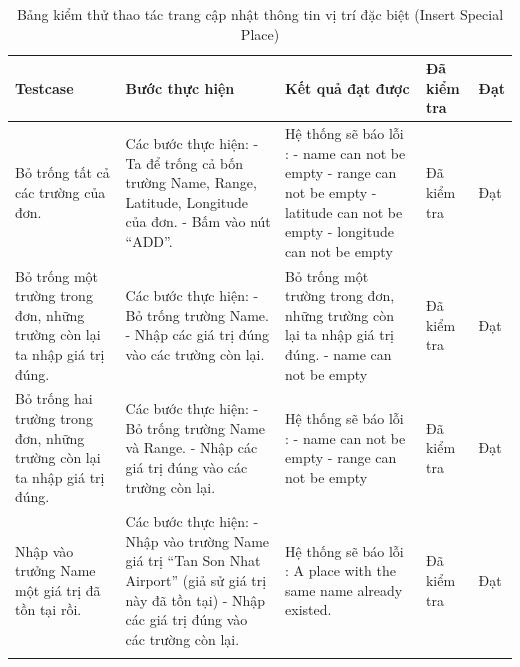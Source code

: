 \documentclass[a4paper]{article}
\begin{document}
\begin{longtable}{ | p{} |p{} | p{}  | p{}  | p{}  | } 
\hline
\textbf{Testcase}& \textbf{Bước thực hiện}& \textbf{Kết quả đạt được} & \textbf{Đã kiểm tra}& \textbf{Đạt} \\ 
\hline
\hline
Bỏ trống tất cả các trường của đơn. &
Các bước thực hiện: \newline
- Ta để trống cả bốn trường Name, Range, Latitude, Longitude của đơn. \newline
- Bấm vào nút “ADD”.
&
Hệ thống sẽ báo lỗi :  \newline
- name can not be empty \newline
- range can not be empty \newline
- latitude can not be empty \newline
- longitude can not be empty
 &
Đã kiểm tra &
Đạt \\

\hline
Bỏ trống một trường trong đơn, những trường còn lại ta nhập giá trị đúng. &
Các bước thực hiện: \newline
- Bỏ trống trường Name.  \newline
- Nhập các giá trị đúng vào các trường còn lại. 
&
Bỏ trống một trường trong đơn, những trường còn lại ta nhập giá trị đúng.  \newline
- name can not be empty
 &
Đã kiểm tra &
Đạt \\

\hline
Bỏ trống hai trường trong đơn, những trường còn lại ta nhập giá trị đúng. &
Các bước thực hiện: \newline
- Bỏ trống trường Name và Range.   \newline
- Nhập các giá trị đúng vào các trường còn lại. 
&
Hệ thống sẽ báo lỗi : \newline
- name can not be empty \newline
- range can not be empty
 &
Đã kiểm tra &
Đạt \\

\hline
Nhập vào trưởng Name một giá trị đã tồn tại rồi. &
Các bước thực hiện: \newline
- Nhập vào trường Name giá trị 
“Tan Son Nhat Airport” (giả sử giá trị này đã tồn tại) \newline
- Nhập các giá trị đúng vào các trường còn lại. 
&
Hệ thống sẽ báo lỗi : A place with the same name already existed.
 &
Đã kiểm tra &
Đạt \\

\hline
\caption{Bảng kiểm thử thao tác trang cập nhật thông tin vị trí đặc biệt (Insert Special Place)}
\end{longtable}
\end{document}
